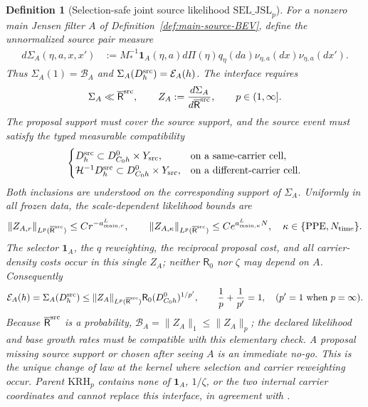 \documentclass[11pt]{article}
\newtheorem{definition}[theorem]{Definition}
\newcommand{\one}{\mathbf 1}
\begin{document}
\begin{definition}[Selection-safe joint source likelihood
$\mathrm{SEL\_JSL}_{p}$]
For a nonzero main Jensen filter $A$ of
Definition~\ref{def:main-source-BEV}, define the \emph{unnormalized} source
pair measure
\begin{align}
 d\Sigma_A(\eta,a,x,x')
 &:=M_*^{-1}\one_A(\eta,a)
    d\Pi(\eta)q_\eta(da)
    \nu_{\eta,a}(dx)\nu_{\eta,a}(dx').
 \label{eq:unnormalized-selected-source-pair}
\end{align}
Thus $\Sigma_A(1)=\mathcal B_A$ and
$\Sigma_A(D_h^{\rm src})=\mathcal E_A(h)$.  The interface requires
\begin{equation}
\label{eq:joint-source-likelihood}
\Sigma_A\ll\overline{\mathsf R}^{\rm src},
 \qquad Z_A:=\frac{d\Sigma_A}{d\overline{\mathsf R}^{\rm src}},
 \qquad p\in(1,\infty].
\end{equation}
The proposal support must cover the source support, and the source event must
satisfy the typed measurable compatibility
\[
 \begin{cases}
 D_h^{\rm src}\subset D_{C_0h}^{0}\times Y_{\rm src},
   &\text{on a same-carrier cell},\\
 \mathcal H^{-1}D_h^{\rm src}\subset
   D_{C_0h}^{0}\times Y_{\rm src},
   &\text{on a different-carrier cell}.
 \end{cases}
\]
Both inclusions are understood on the corresponding support of $\Sigma_A$.
Uniformly in all
frozen data, the scale-dependent likelihood bounds are
\begin{equation}
\label{eq:selection-safe-likelihood-rates}
 \|Z_{A,r}\|_{L^p(\overline{\mathsf R}^{\rm src})}
 \le Cr^{-a_{{\rm main},r}^{L}},\qquad
 \|Z_{A,\kappa}\|_{L^p(\overline{\mathsf R}^{\rm src})}
 \le Ce^{a_{{\rm main},\kappa}^{L}N},
 \quad \kappa\in\{{\rm PPE},N_{\rm time}\}.
\end{equation}
The selector $\one_A$, the $q$ reweighting, the reciprocal proposal cost,
and all carrier-density costs occur in this single $Z_A$; neither
$\mathsf R_0$ nor $\zeta$ may depend on $A$.  Consequently
\begin{equation}
\label{eq:joint-source-energy-transfer}
 \mathcal E_A(h)=\Sigma_A(D_h^{\rm src})
 \le \|Z_A\|_{L^p(\overline{\mathsf R}^{\rm src})}
       \mathsf R_0(D_{C_0h}^0)^{1/p'},
 \qquad \frac1p+\frac1{p'}=1,
 \quad (p'=1\text{ when }p=\infty).
\end{equation}
Because $\overline{\mathsf R}^{\rm src}$ is a probability,
$\mathcal B_A=\|Z_A\|_1\le\|Z_A\|_p$; the declared likelihood and base
growth rates must be compatible with this elementary check.  A proposal
missing source support or chosen after seeing $A$ is an immediate no-go.
This is the unique change of law at the kernel where selection and carrier
reweighting occur.  Parent $\mathrm{KRH}_p$ contains none of
$\one_A$, $1/\zeta$, or the two internal carrier coordinates and cannot
replace this interface, in agreement with \cite{NiKernel}.
\end{definition}
\end{document}
